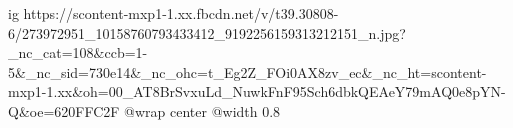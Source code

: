  
 
 
 
 

\ifcmt
  ig https://scontent-mxp1-1.xx.fbcdn.net/v/t39.30808-6/273972951_10158760793433412_9192256159313212151_n.jpg?_nc_cat=108&ccb=1-5&_nc_sid=730e14&_nc_ohc=t_Eg2Z_FOi0AX8zv_ec&_nc_ht=scontent-mxp1-1.xx&oh=00_AT8BrSvxuLd_NuwkFnF95Sch6dbkQEAeY79mAQ0e8pYN-Q&oe=620FFC2F
  @wrap center
  @width 0.8
\fi
